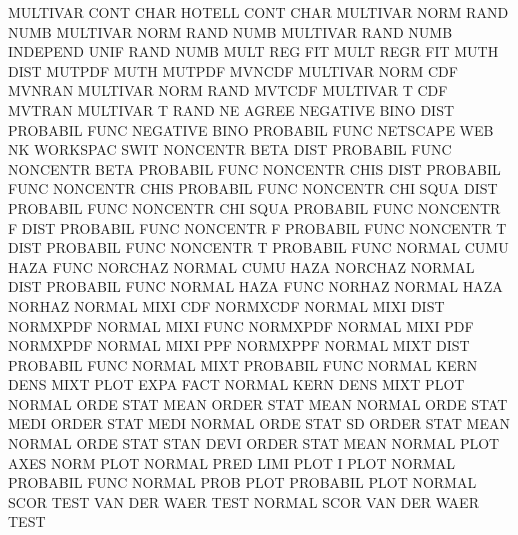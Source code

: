 MULTIVAR CONT CHAR                      HOTELL   CONT CHAR
MULTIVAR NORM RAND NUMB                 MULTIVAR NORM RAND NUMB
MULTIVAR RAND NUMB                      INDEPEND UNIF RAND NUMB
MULT     REG                            FIT
MULT     REGR                           FIT
MUTH     DIST                           MUTPDF
MUTH                                    MUTPDF
MVNCDF                                  MULTIVAR NORM CDF
MVNRAN                                  MULTIVAR NORM RAND
MVTCDF                                  MULTIVAR T    CDF
MVTRAN                                  MULTIVAR T    RAND
NE                                      AGREE
NEGATIVE BINO DIST                      PROBABIL FUNC
NEGATIVE BINO                           PROBABIL FUNC
NETSCAPE                                WEB
NK                                      WORKSPAC SWIT
NONCENTR BETA DIST                      PROBABIL FUNC
NONCENTR BETA                           PROBABIL FUNC
NONCENTR CHIS DIST                      PROBABIL FUNC
NONCENTR CHIS                           PROBABIL FUNC
NONCENTR CHI  SQUA DIST                 PROBABIL FUNC
NONCENTR CHI  SQUA                      PROBABIL FUNC
NONCENTR F    DIST                      PROBABIL FUNC
NONCENTR F                              PROBABIL FUNC
NONCENTR T    DIST                      PROBABIL FUNC
NONCENTR T                              PROBABIL FUNC
NORMAL   CUMU HAZA FUNC                 NORCHAZ
NORMAL   CUMU HAZA                      NORCHAZ
NORMAL   DIST                           PROBABIL FUNC
NORMAL   HAZA FUNC                      NORHAZ
NORMAL   HAZA                           NORHAZ
NORMAL   MIXI CDF                       NORMXCDF
NORMAL   MIXI DIST                      NORMXPDF
NORMAL   MIXI FUNC                      NORMXPDF
NORMAL   MIXI PDF                       NORMXPDF
NORMAL   MIXI PPF                       NORMXPPF
NORMAL   MIXT DIST                      PROBABIL FUNC
NORMAL   MIXT                           PROBABIL FUNC
NORMAL   KERN DENS MIXT PLOT EXPA FACT  NORMAL   KERN DENS MIXT PLOT
NORMAL   ORDE STAT MEAN                 ORDER    STAT MEAN
NORMAL   ORDE STAT MEDI                 ORDER    STAT MEDI
NORMAL   ORDE STAT SD                   ORDER    STAT MEAN
NORMAL   ORDE STAT STAN DEVI            ORDER    STAT MEAN
NORMAL   PLOT AXES                      NORM     PLOT
NORMAL   PRED LIMI PLOT                 I        PLOT
NORMAL                                  PROBABIL FUNC
NORMAL   PROB PLOT                      PROBABIL PLOT
NORMAL   SCOR TEST                      VAN      DER  WAER TEST
NORMAL   SCOR                           VAN      DER  WAER TEST
